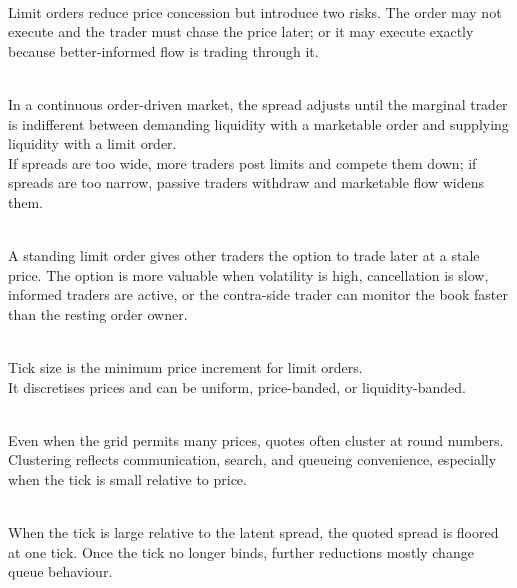 \begin{caveat} \\
Limit orders reduce price concession but introduce two risks. The order may not execute and the trader must chase the price later; or it may execute exactly because better-informed flow is trading through it.
\end{caveat}

\begin{principle} \\
In a continuous order-driven market, the spread adjusts until the marginal trader is indifferent between demanding liquidity with a marketable order and supplying liquidity with a limit order.\\
If spreads are too wide, more traders post limits and compete them down; if spreads are too narrow, passive traders withdraw and marketable flow widens them.
\end{principle}

\begin{mechanism} \\
A standing limit order gives other traders the option to trade later at a stale price. The option is more valuable when volatility is high, cancellation is slow, informed traders are active, or the contra-side trader can monitor the book faster than the resting order owner.
\end{mechanism}

\begin{definition} \\
Tick size is the minimum price increment for limit orders.\\
It discretises prices and can be uniform, price-banded, or liquidity-banded.
\end{definition}

\begin{empiricalfinding} \\
Even when the grid permits many prices, quotes often cluster at round numbers. Clustering reflects communication, search, and queueing convenience, especially when the tick is small relative to price.
\end{empiricalfinding}

\begin{mechanism} \\
When the tick is large relative to the latent spread, the quoted spread is floored at one tick. Once the tick no longer binds, further reductions mostly change queue behaviour.
\end{mechanism}

